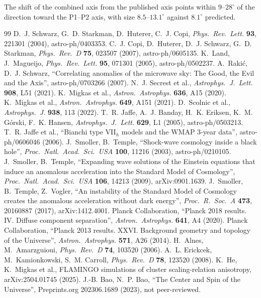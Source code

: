 \documentclass[11pt,a4paper]{article}
\newcommand{\dg}{^\circ}
\begin{document}
The shift of the combined axis from the published axis points within $9$--$28\dg$ of the direction toward the P1--P2 axis, with size $8.5$--$13.1\dg$ against $8.1\dg$ predicted.

\begin{thebibliography}{99}\small\setlength{\itemsep}{0pt}\setlength{\parskip}{0pt}
 D.~J. Schwarz, G.~D. Starkman, D.~Huterer, C.~J. Copi, \emph{Phys.\ Rev.\ Lett.} \textbf{93}, 221301 (2004), astro-ph/0403353.
 C.~J. Copi, D.~Huterer, D.~J. Schwarz, G.~D. Starkman, \emph{Phys.\ Rev.\ D} \textbf{75}, 023507 (2007), astro-ph/0605135.
 K.~Land, J.~Magueijo, \emph{Phys.\ Rev.\ Lett.} \textbf{95}, 071301 (2005), astro-ph/0502237.
 A.~Raki\'c, D.~J. Schwarz, ``Correlating anomalies of the microwave sky: The Good, the Evil and the Axis'', astro-ph/0703266 (2007).
 N.~J. Secrest et al., \emph{Astrophys.\ J.\ Lett.} \textbf{908}, L51 (2021).
 K.~Migkas et al., \emph{Astron.\ Astrophys.} \textbf{636}, A15 (2020).
 K.~Migkas et al., \emph{Astron.\ Astrophys.} \textbf{649}, A151 (2021).
 D.~Scolnic et al., \emph{Astrophys.\ J.} \textbf{938}, 113 (2022).
 T.~R. Jaffe, A.~J. Banday, H.~K. Eriksen, K.~M. G\'orski, F.~K. Hansen, \emph{Astrophys.\ J.\ Lett.} \textbf{629}, L1 (2005), astro-ph/0503213.
 T.~R. Jaffe et al., ``Bianchi type VII$_h$ models and the WMAP 3-year data'', astro-ph/0606046 (2006).
 J.~Smoller, B.~Temple, ``Shock-wave cosmology inside a black hole'', \emph{Proc.\ Natl.\ Acad.\ Sci.\ USA} \textbf{100}, 11216 (2003), astro-ph/0210105.
 J.~Smoller, B.~Temple, ``Expanding wave solutions of the Einstein equations that induce an anomalous acceleration into the Standard Model of Cosmology'', \emph{Proc.\ Natl.\ Acad.\ Sci.\ USA} \textbf{106}, 14213 (2009), arXiv:0901.1639.
 J.~Smoller, B.~Temple, Z.~Vogler, ``An instability of the Standard Model of Cosmology creates the anomalous acceleration without dark energy'', \emph{Proc.\ R.\ Soc.\ A} \textbf{473}, 20160887 (2017), arXiv:1412.4001.
 Planck Collaboration, ``Planck 2018 results. IV. Diffuse component separation'', \emph{Astron.\ Astrophys.} \textbf{641}, A4 (2020).
 Planck Collaboration, ``Planck 2013 results. XXVI. Background geometry and topology of the Universe'', \emph{Astron.\ Astrophys.} \textbf{571}, A26 (2014).
 H.~Alnes, M.~Amarzguioui, \emph{Phys.\ Rev.\ D} \textbf{74}, 103520 (2006).
 A.~L. Erickcek, M.~Kamionkowski, S.~M. Carroll, \emph{Phys.\ Rev.\ D} \textbf{78}, 123520 (2008).
 K.~He, K.~Migkas et al., FLAMINGO simulations of cluster scaling-relation anisotropy, arXiv:2504.01745 (2025).
 J.-B. Bao, N.~P. Bao, ``The Center and Spin of the Universe'', Preprints.org 202306.1689 (2023), not peer-reviewed.
\end{thebibliography}
\end{document}

